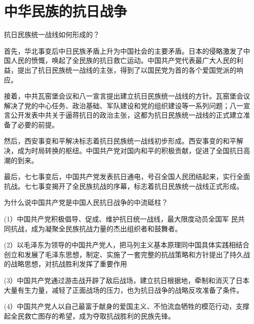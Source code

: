 \documentclass[lang=cn,10pt]{elegantbook}
\begin{document}
	\chapter{中华民族的抗日战争}
	\begin{example}
		抗日民族统一战线如何形成的？
	\end{example}
	\begin{solution}
		
		首先，华北事变后中日民族矛盾上升为中国社会的主要矛盾。日本的侵略激发了中国人民的愤慨，唤起了全民族的抗日救亡运动。中国共产党代表最广大人民的利益，提出了抗日民族统一战线的主张，得到了以国民党为首的各个爱国党派的响应。
		
		接着，中共瓦窑堡会议和八一宣言提出建立抗日民族统一战线的方针。瓦窑堡会议解决了党的中心任务、政治基础、军队建设和党的组织建设等一系列问题；八一宣言公开发表中共关于逼蒋抗日的政治主张，这都为抗日民族统一战线的正式建立准备了必要的前提。
		
		然后，西安事变和平解决标志着抗日民族统一战线初步形成。西安事变的和平解决，成为时局转换的枢纽。中国共产党对国内和平的积极贡献，促进了全国抗日高潮的到来。
		
		最后，七七事变后，中国共产党发表抗日通电，号召全国人民团结起来，实行全面抗战。七七事变揭开了全民族抗战的序幕，标志着抗日民族统一战线正式形成。
	\end{solution}
	\begin{example}
		为什么说中国共产党是中国人民抗日战争的中流砥柱？
	\end{example}
	\begin{solution}
		
		(1）中国共产党积极倡导、促成、维护抗日统一战线，最大限度动员全国军
		民共同抗战，成为凝聚全民族抗战力量的杰出组织者和鼓舞者。
		
		(2）以毛泽东为领导的中国共产党人，把马列主义基本原理同中国具体实践相结合创立和发展了毛泽东思想，制定、实施了一套完整的抗战策略和方针提出了持久战的战略思想，对抗战胜利发挥了重要作用
		
		
		(3）中国共产党通过游击战开辟了敌后战场，建立抗日根据地，牵制和消灭了日本大量有生力量，减轻了正面战场的压力，也为抗日战争的战略反攻准备了条件。
		
		(4）中国共产党人以自己最富于献身的爱国主义、不怕流血牺牲的模范行动，支撑起全民救亡图存的希望，成为夺取抗战胜利的民族先锋。
	\end{solution}
	
\end{document}
